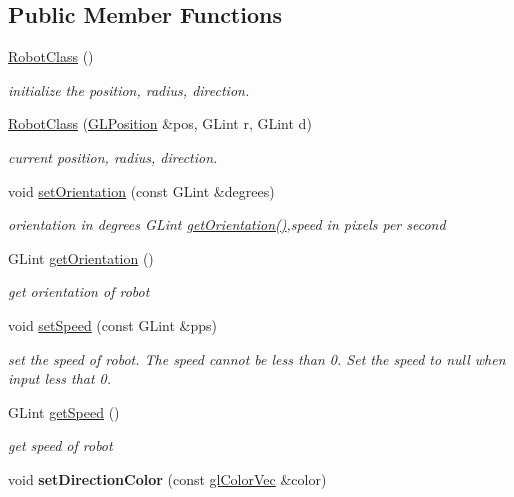 \subsection*{Public Member Functions}
\begin{DoxyCompactItemize}
\item 
\hyperlink{classRobotClass_a7125604039c2a4b39e34e4354bd4ce19}{Robot\-Class} ()
\begin{DoxyCompactList}\small\item\em initialize the position, radius, direction. \end{DoxyCompactList}\item 
\hyperlink{classRobotClass_ae38ea864dfa0cc63e64a33f33334d804}{Robot\-Class} (\hyperlink{structGLPosition}{G\-L\-Position} \&pos, G\-Lint r, G\-Lint d)
\begin{DoxyCompactList}\small\item\em current position, radius, direction. \end{DoxyCompactList}\item 
void \hyperlink{classRobotClass_a83fc8dd757868ab599208245e3aa04cb}{set\-Orientation} (const G\-Lint \&degrees)
\begin{DoxyCompactList}\small\item\em orientation in degrees G\-Lint \hyperlink{classRobotClass_a808e1643328178e9b0742bab2480d2d4}{get\-Orientation()},speed in pixels per second \end{DoxyCompactList}\item 
G\-Lint \hyperlink{classRobotClass_a808e1643328178e9b0742bab2480d2d4}{get\-Orientation} ()
\begin{DoxyCompactList}\small\item\em get orientation of robot \end{DoxyCompactList}\item 
void \hyperlink{classRobotClass_ada07c364411e6d4c3efd6c5f5e4e6275}{set\-Speed} (const G\-Lint \&pps)
\begin{DoxyCompactList}\small\item\em set the speed of robot. The speed cannot be less than 0. Set the speed to null when input less that 0. \end{DoxyCompactList}\item 
G\-Lint \hyperlink{classRobotClass_ac39e7492ee082cb36818f93845c75983}{get\-Speed} ()
\begin{DoxyCompactList}\small\item\em get speed of robot \end{DoxyCompactList}\item 
\hypertarget{classRobotClass_a1fbee3e9632e92bb6cde8ef3db4ce9eb}{void {\bfseries set\-Direction\-Color} (const \hyperlink{Common_8h_a5113b6588451c418d38d8b3681eb6040}{gl\-Color\-Vec} \&color)}\label{classRobotClass_a1fbee3e9632e92bb6cde8ef3db4ce9eb}


\end{DoxyCompactItemize}
